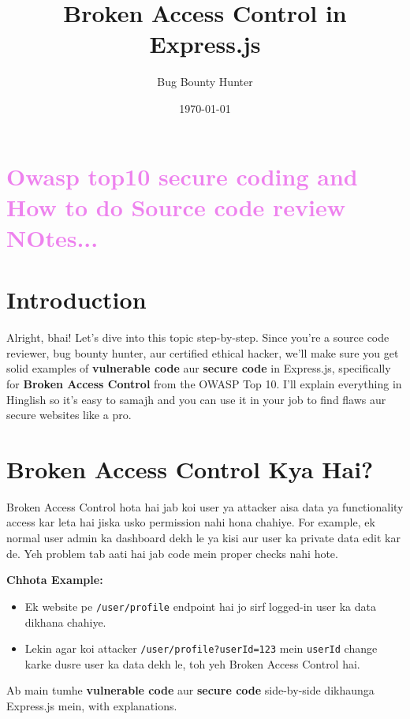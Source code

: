 \documentclass[a4paper, 12pt]{article}
\begin{document}
\section*{\textbf{\LARGE \textcolor{violet}{
Owasp top10 secure coding 
and How to do Source code review NOtes...
}}}

\title{\textbf{\color{sectionblue}Broken Access Control in Express.js}}
\author{Bug Bounty Hunter}
\date{\today}
\maketitle

\section{Introduction}
Alright, bhai! Let's dive into this topic step-by-step. Since you're a source code reviewer, bug bounty hunter, aur certified ethical hacker, we'll make sure you get solid examples of \textbf{\color{importantred}vulnerable code} aur \textbf{\color{keyconceptgreen}secure code} in Express.js, specifically for \textbf{\color{importantred}Broken Access Control} from the OWASP Top 10. I'll explain everything in Hinglish so it's easy to samajh and you can use it in your job to find flaws aur secure websites like a pro.

\section{Broken Access Control Kya Hai?}
Broken Access Control hota hai jab koi user ya attacker aisa data ya functionality access kar leta hai jiska usko permission nahi hona chahiye. For example, ek normal user admin ka dashboard dekh le ya kisi aur user ka private data edit kar de. Yeh problem tab aati hai jab code mein proper checks nahi hote.

\textbf{\color{importantred}Chhota Example:}
\begin{itemize}
    \item Ek website pe \texttt{/user/profile} endpoint hai jo sirf logged-in user ka data dikhana chahiye.
    \item Lekin agar koi attacker \texttt{/user/profile?userId=123} mein \texttt{userId} change karke dusre user ka data dekh le, toh yeh Broken Access Control hai.
\end{itemize}

Ab main tumhe \textbf{\color{importantred}vulnerable code} aur \textbf{\color{keyconceptgreen}secure code} side-by-side dikhaunga Express.js mein, with explanations.
\end{document}
